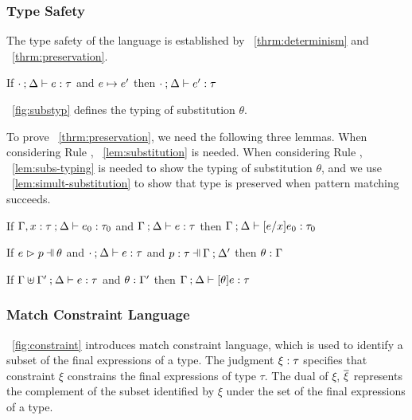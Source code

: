 \documentclass[runningheads,envcountsame,a4paper]{llncs}
\begin{document}
\subsubsection{Type Safety}
The type safety of the language is established by
\theoremname~\ref{thrm:determinism} and \theoremname~\ref{thrm:preservation}.

\begin{theorem}[Preservation]
  \label{thrm:preservation}
  If $\cdot \mathbin{;} \Delta \vdash e : \tau$ and $e \mapsto e'$
  then $\cdot \mathbin{;} \Delta \vdash e' : \tau$
\end{theorem}



\figurename~\ref{fig:substyp} defines the typing of substitution $\theta$.

To prove \theoremname~\ref{thrm:preservation}, we need the following three lemmas.
When considering Rule \ITAp, \lemmaname~\ref{lem:substitution} is needed.
When considering Rule \ITSuccMatch, \lemmaname~\ref{lem:subs-typing} is needed
to show the typing of substitution $\theta$, and we use
\lemmaname~\ref{lem:simult-substitution} to show that type is preserved when pattern
matching succeeds.

\begin{lemma}[Substitution]
  \label{lem:substitution}
  If $\Gamma, x : \tau \mathbin{;} \Delta \vdash e_0 : \tau_0$ and $\Gamma \mathbin{;} \Delta \vdash e : \tau$
  then $\Gamma \mathbin{;} \Delta \vdash [e/x]e_0 : \tau_0$
\end{lemma}

\begin{lemma}
  \label{lem:subs-typing}
  If $\hpatmatch{e}{p}{\theta}$ and $\cdot \mathbin{;} \Delta \vdash e : \tau$ and $\hpattyp{p}{\tau}{\Gamma}{\Delta'}$
  then $\theta : \Gamma$
\end{lemma}

\begin{lemma}
  \label{lem:simult-substitution}
  If $\Gamma \uplus \Gamma' \mathbin{;} \Delta \vdash e : \tau$ and $\theta : \Gamma'$
  then $\Gamma \mathbin{;} \Delta \vdash [\theta]e : \tau$
\end{lemma}

\subsubsection{Match Constraint Language}\label{sec:constraint}


\figurename~\ref{fig:constraint} introduces match constraint language, which is
used to identify a subset of the final expressions of a type. The judgment
$\xi : \tau$ specifies that constraint $\xi$ constrains the final
expressions of type $\tau$. The dual of $\xi$, $\overline{\xi}$ represents the
complement of the subset identified by $\xi$ under the set of the final
expressions of a type.
\end{document}
